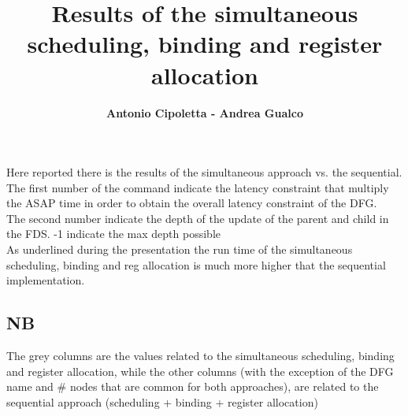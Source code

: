 \documentclass[a4paper, 11pt, oneside]{article}
\title{\textbf{Results of the simultaneous scheduling, binding and register allocation}}
\author{\textbf{Antonio Cipoletta - Andrea Gualco}}
\begin{document}
\begin{landscape}
\maketitle
Here reported there is the results of the simultaneous approach vs. the sequential.\\
The first number of the command indicate the latency constraint that multiply the ASAP time in order to obtain
the overall latency constraint of the DFG.\\
The second number indicate the depth of the update of the parent and child in the FDS. -1 indicate the max depth possible\\
As underlined during the presentation the run time of the simultaneous scheduling, binding and reg allocation is much more
higher that the sequential implementation.

\subsection{NB}
The grey columns are the values related to the simultaneous scheduling, binding and register allocation,
while the other columns (with the exception of the DFG name and \# nodes that are common for both approaches),
are related to the sequential approach (scheduling + binding + register allocation)
\clearpage

\end{landscape}
\end{document}
